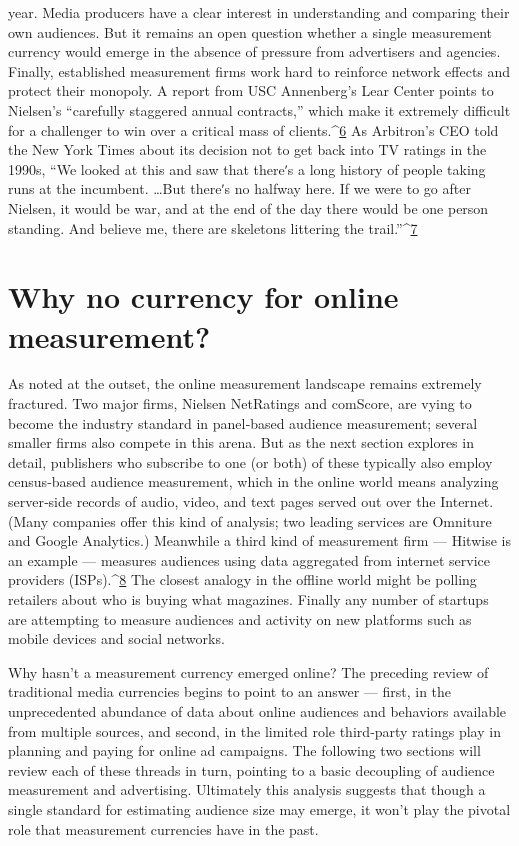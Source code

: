year. Media producers have a clear interest in understanding and
comparing their own audiences. But it remains an open question whether
a single measurement currency would emerge in the absence of pressure
from advertisers and agencies.
Finally, established measurement firms work hard to reinforce network
effects and protect their monopoly. A report from USC Annenberg’s Lear
Center points to Nielsen’s ``carefully staggered annual contracts,'' which
make it extremely difficult for a challenger to win over a critical mass of
clients.^{\href{#endnotes}{6}} As Arbitron’s CEO told the New York Times about its decision not
to get back into TV ratings in the 1990s, ``We looked at this and saw that
thereʹs a long history of people taking runs at the incumbent. \ldots  But
thereʹs no halfway here. If we were to go after Nielsen, it would be war,
and at the end of the day there would be one person standing. And
believe me, there are skeletons littering the trail.''^{\href{#endnotes}{7}}

\section{Why no currency for online measurement?}
As noted at the outset, the online measurement landscape remains
extremely fractured. Two major firms, Nielsen NetRatings and comScore,
are vying to become the industry standard in panel‐based audience
measurement; several smaller firms also compete in this arena. But as the
next section explores in detail, publishers who subscribe to one (or both)
of these typically also employ census‐based audience measurement,
which in the online world means analyzing server‐side records of audio,
video, and text pages served out over the Internet. (Many companies offer
this kind of analysis; two leading services are Omniture and Google
Analytics.) Meanwhile a third kind of measurement firm — Hitwise is an
example — measures audiences using data aggregated from internet
service providers (ISPs).^{\href{#endnotes}{8}} The closest analogy in the offline world might be
polling retailers about who is buying what magazines. Finally any number
of startups are attempting to measure audiences and activity on new
platforms such as mobile devices and social networks.

Why hasn’t a measurement currency emerged online? The preceding
review of traditional media currencies begins to point to an answer —
first, in the unprecedented abundance of data about online audiences and
behaviors available from multiple sources, and second, in the limited role
third‐party ratings play in planning and paying for online ad campaigns.
The following two sections will review each of these threads in turn,
pointing to a basic decoupling of audience measurement and advertising.
Ultimately this analysis suggests that though a single standard for
estimating audience size may emerge, it won’t play the pivotal role that
measurement currencies have in the past.

